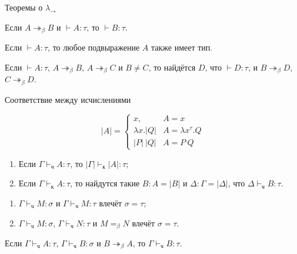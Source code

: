 \documentclass[aspectratio=169]{beamer}
\begin{document}
\begin{frame}{Теоремы о $\lambda_\rightarrow$}

\begin{lmm}
Если $A \twoheadrightarrow_\beta B$ и $\vdash A: \tau$, то $\vdash B: \tau$.
\end{lmm}

\begin{lmm}
Если $\vdash A : \tau$, то любое подвыражение $A$ также имеет тип.
\end{lmm}

\begin{thm}
Если $\vdash A:\tau$, $A \twoheadrightarrow_\beta B$, $A \twoheadrightarrow_\beta C$ и $B \ne C$, то найдётся $D$, что 
$\vdash D :\tau$, и $B \twoheadrightarrow_\beta D$, $C \twoheadrightarrow_\beta D$.
\end{thm}
\end{frame}

\begin{frame}{Соответствие между исчислениями}
\begin{dfn}
$$|A|=\left\{\begin{array}{ll}x, & A = x\\
\lambda x.|Q| & A = \lambda x^\tau.Q\\
|P|\ |Q| & A = P\ Q
\end{array}\right.$$
\end{dfn}\vspace{-0.5cm}

\begin{thm}\begin{enumerate}
\item Если $\Gamma \vdash_\text{ч} A : \tau$, то $|\Gamma| \vdash_\text{к} |A| : \tau$;
\item Если $\Gamma \vdash_\text{к} A : \tau$, то найдутся такие $B: A = |B|$ и $\Delta: \Gamma=|\Delta|$, что $\Delta \vdash_\text{ч} B : \tau$.
\end{enumerate}
\end{thm}

\begin{thm}
\begin{enumerate}
\item $\Gamma \vdash_\text{ч} M : \sigma$ и $\Gamma \vdash_\text{ч} M: \tau$ влечёт $\sigma = \tau$;
\item $\Gamma \vdash_\text{ч} M : \sigma$, $\Gamma \vdash_\text{ч} N : \tau$ и $M =_\beta N$ влечёт $\sigma = \tau$.
\end{enumerate}
\end{thm}

\begin{lmm}
Если $\Gamma \vdash_\text{ч} A : \tau$, $\Gamma\vdash_\text{ч} B : \sigma$ и $B \twoheadrightarrow_\beta A$, то $\Gamma \vdash_\text{ч} B : \tau$.
\end{lmm}
\end{frame}
\end{document}

